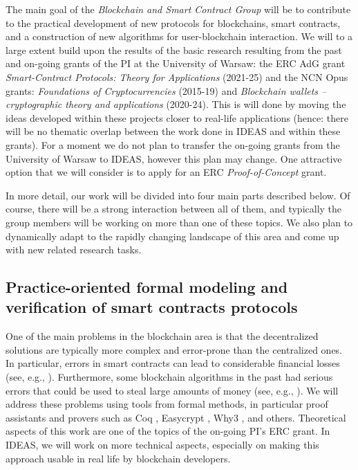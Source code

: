 \documentclass{article}
\begin{document}
The main goal of the \emph{Blockchain and Smart Contract Group} will be to contribute to the practical development of new protocols for blockchains, smart contracts, and a construction of new algorithms for user-blockchain interaction. 
We will to a large extent build upon the results of the basic research resulting from the past and on-going grants of the PI at the University of Warsaw: the ERC AdG grant \emph{Smart-Contract Protocols: Theory for Applications} (2021-25) and the NCN Opus grants: \emph{Foundations of Cryptocurrencies} (2015-19) and \emph{Blockchain wallets -- cryptographic theory and applications} (2020-24). This is will done by moving the ideas developed within these projects closer to real-life applications (hence: there will be no thematic overlap between the work done in IDEAS and within these grants). For a moment we do not plan to transfer the on-going grants from the University of Warsaw to IDEAS, however this plan may change. One attractive option that we will consider is to apply for an ERC \emph{Proof-of-Concept} grant.

In more detail, our work will be divided into four main parts described below. Of course, there will be a strong interaction between all of them, and typically the group members will be working on more than one of these topics. We also plan to dynamically adapt to the rapidly changing landscape of this area and come up with new related research tasks.




\subsection{Practice-oriented formal modeling and verification of smart contracts protocols}\label{sec:verif}

One of the main problems in the blockchain area is that the decentralized solutions are typically more complex and error-prone than the centralized ones. In particular, errors in smart contracts can lead to considerable financial losses (see, e.g., \cite{DAO}). Furthermore, some blockchain algorithms in the past had serious errors that could be used to steal large amounts of money (see, e.g., \cite{HACKETT}).  We will address these problems using tools from formal methods, in particular proof assistants and provers such as Coq \cite{Chlipala2013}, Easycrypt \cite{Barthe2013}, Why3 \cite{Santos2015}, and others. Theoretical aspects of this work are one of the topics of the on-going PI's ERC grant. In IDEAS, we will work on more technical aspects, especially on making this approach usable in real life by blockchain developers.
\end{document}
